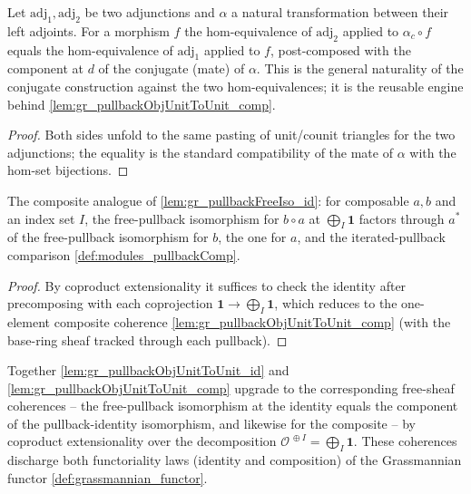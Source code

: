 \begin{lemma}
  \label{lem:gr_homEquiv_conjugateEquiv_app}
  Let \(\mathrm{adj}_1, \mathrm{adj}_2\) be two adjunctions and \(\alpha\) a natural
  transformation between their left adjoints. For a morphism \(f\) the hom-equivalence of
  \(\mathrm{adj}_2\) applied to \(\alpha_c \circ f\) equals the hom-equivalence of
  \(\mathrm{adj}_1\) applied to \(f\), post-composed with the component at \(d\) of the
  conjugate (mate) of \(\alpha\). This is the general naturality of the conjugate
  construction against the two hom-equivalences; it is the reusable engine behind
  \cref{lem:gr_pullbackObjUnitToUnit_comp}.
\end{lemma}

\begin{proof}


\leanok
  Both sides unfold to the same pasting of unit/counit triangles for the two adjunctions;
  the equality is the standard compatibility of the mate of \(\alpha\) with the
  hom-set bijections.
\end{proof}

\begin{lemma}
  \label{lem:gr_pullbackFreeIso_comp}
  The composite analogue of \cref{lem:gr_pullbackFreeIso_id}: for composable \(a, b\) and an
  index set \(I\), the free-pullback isomorphism for \(b \circ a\) at \(\bigoplus_I \mathbf 1\)
  factors through \(a^{*}\) of the free-pullback isomorphism for \(b\), the one for \(a\), and
  the iterated-pullback comparison \cref{def:modules_pullbackComp}.
\end{lemma}

\begin{proof}
  \leanok
  By coproduct extensionality it suffices to check the identity after precomposing with each
  coprojection \(\mathbf 1 \to \bigoplus_I \mathbf 1\), which reduces to the one-element
  composite coherence \cref{lem:gr_pullbackObjUnitToUnit_comp} (with the base-ring sheaf
  tracked through each pullback).
\end{proof}

Together \cref{lem:gr_pullbackObjUnitToUnit_id} and \cref{lem:gr_pullbackObjUnitToUnit_comp}
upgrade to the corresponding free-sheaf coherences -- the free-pullback isomorphism at the
identity equals the component of the pullback-identity isomorphism, and likewise for the
composite -- by coproduct extensionality over the decomposition
\(\mathcal{O}^{\,\oplus I} = \bigoplus_I \mathbf 1\). These coherences discharge both
functoriality laws (identity and composition) of the Grassmannian
functor \cref{def:grassmannian_functor}.

